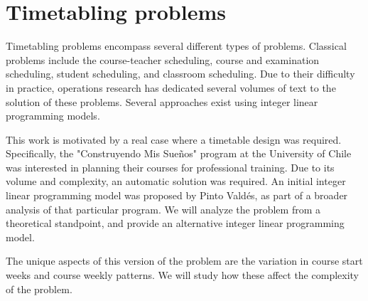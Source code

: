 \section{Timetabling problems}

Timetabling problems encompass several different types of problems. Classical problems include the course-teacher scheduling\cite{dewerra}, course and examination scheduling\cite{carterlaporte}, student scheduling\cite{studentsched}, and classroom scheduling\cite{classroom}. Due to their difficulty in practice, operations research has dedicated several volumes of text to the solution of these problems. Several approaches exist using integer linear programming models.

This work is motivated by a real case where a timetable design was required. Specifically, the "Construyendo Mis Sueños" program at the University of Chile was interested in planning their courses for professional training. Due to its volume and complexity, an automatic solution was required. An initial integer linear programming model\cite{PintoValdes} was proposed by Pinto Valdés, as part of a broader analysis of that particular program. We will analyze the problem from a theoretical standpoint, and provide an alternative integer linear programming model.

The unique aspects of this version of the problem are the variation in course start weeks and course weekly patterns. We will study how these affect the complexity of the problem.
